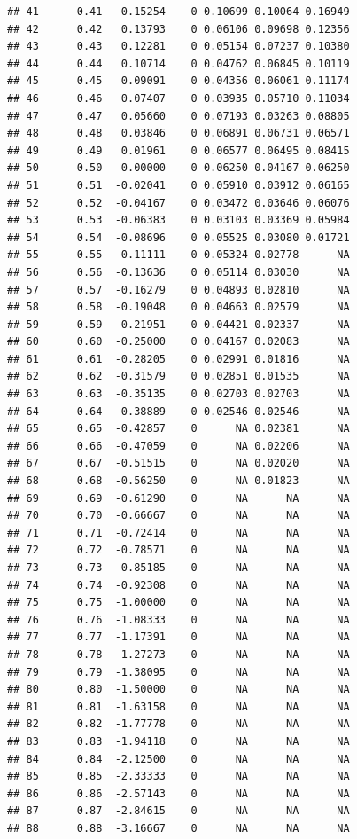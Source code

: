 \documentclass{article}\usepackage[]{graphicx}\usepackage[]{color}
\makeatletter
\newenvironment{kframe}{%
 \def\at@end@of@kframe{}%
 \ifinner\ifhmode%
  \def\at@end@of@kframe{\end{minipage}}%
  \begin{minipage}{\columnwidth}%
 \fi\fi%
 \def\FrameCommand##1{\hskip\@totalleftmargin \hskip-\fboxsep
 \colorbox{shadecolor}{##1}\hskip-\fboxsep
     \hskip-\linewidth \hskip-\@totalleftmargin \hskip\columnwidth}%
 \MakeFramed {\advance\hsize-\width
   \@totalleftmargin\z@ \linewidth\hsize
   \@setminipage}}%
 {\par\unskip\endMakeFramed%
 \at@end@of@kframe}
\newenvironment{knitrout}{}{} %
\makeatother
\begin{document}
\begin{knitrout}
\begin{kframe}
\begin{verbatim}
## 41      0.41   0.15254    0 0.10699 0.10064 0.16949
## 42      0.42   0.13793    0 0.06106 0.09698 0.12356
## 43      0.43   0.12281    0 0.05154 0.07237 0.10380
## 44      0.44   0.10714    0 0.04762 0.06845 0.10119
## 45      0.45   0.09091    0 0.04356 0.06061 0.11174
## 46      0.46   0.07407    0 0.03935 0.05710 0.11034
## 47      0.47   0.05660    0 0.07193 0.03263 0.08805
## 48      0.48   0.03846    0 0.06891 0.06731 0.06571
## 49      0.49   0.01961    0 0.06577 0.06495 0.08415
## 50      0.50   0.00000    0 0.06250 0.04167 0.06250
## 51      0.51  -0.02041    0 0.05910 0.03912 0.06165
## 52      0.52  -0.04167    0 0.03472 0.03646 0.06076
## 53      0.53  -0.06383    0 0.03103 0.03369 0.05984
## 54      0.54  -0.08696    0 0.05525 0.03080 0.01721
## 55      0.55  -0.11111    0 0.05324 0.02778      NA
## 56      0.56  -0.13636    0 0.05114 0.03030      NA
## 57      0.57  -0.16279    0 0.04893 0.02810      NA
## 58      0.58  -0.19048    0 0.04663 0.02579      NA
## 59      0.59  -0.21951    0 0.04421 0.02337      NA
## 60      0.60  -0.25000    0 0.04167 0.02083      NA
## 61      0.61  -0.28205    0 0.02991 0.01816      NA
## 62      0.62  -0.31579    0 0.02851 0.01535      NA
## 63      0.63  -0.35135    0 0.02703 0.02703      NA
## 64      0.64  -0.38889    0 0.02546 0.02546      NA
## 65      0.65  -0.42857    0      NA 0.02381      NA
## 66      0.66  -0.47059    0      NA 0.02206      NA
## 67      0.67  -0.51515    0      NA 0.02020      NA
## 68      0.68  -0.56250    0      NA 0.01823      NA
## 69      0.69  -0.61290    0      NA      NA      NA
## 70      0.70  -0.66667    0      NA      NA      NA
## 71      0.71  -0.72414    0      NA      NA      NA
## 72      0.72  -0.78571    0      NA      NA      NA
## 73      0.73  -0.85185    0      NA      NA      NA
## 74      0.74  -0.92308    0      NA      NA      NA
## 75      0.75  -1.00000    0      NA      NA      NA
## 76      0.76  -1.08333    0      NA      NA      NA
## 77      0.77  -1.17391    0      NA      NA      NA
## 78      0.78  -1.27273    0      NA      NA      NA
## 79      0.79  -1.38095    0      NA      NA      NA
## 80      0.80  -1.50000    0      NA      NA      NA
## 81      0.81  -1.63158    0      NA      NA      NA
## 82      0.82  -1.77778    0      NA      NA      NA
## 83      0.83  -1.94118    0      NA      NA      NA
## 84      0.84  -2.12500    0      NA      NA      NA
## 85      0.85  -2.33333    0      NA      NA      NA
## 86      0.86  -2.57143    0      NA      NA      NA
## 87      0.87  -2.84615    0      NA      NA      NA
## 88      0.88  -3.16667    0      NA      NA      NA

\end{verbatim}
\end{kframe}
\end{knitrout}
\end{document}
